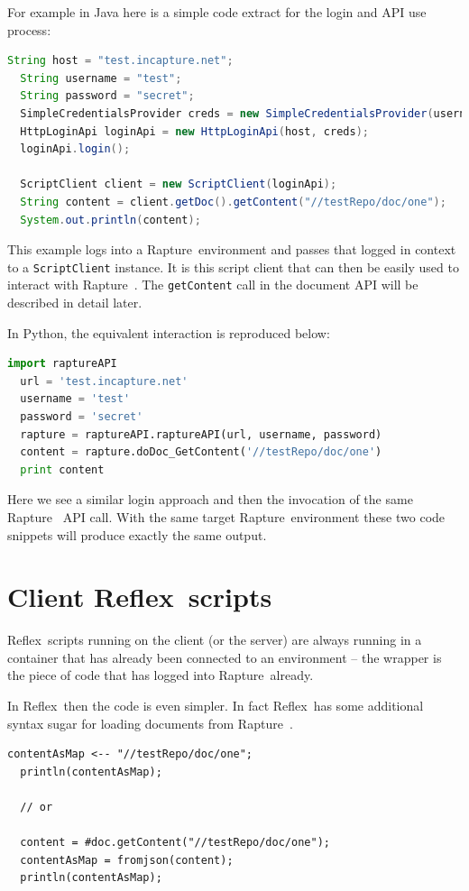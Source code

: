 \documentclass[12pt,twoside,a4paper]{book}
\newcommand{\Rapture}{Rapture~}
\newcommand{\Reflex}{Reflex~}
\begin{document}
For example in Java here is a simple code extract for the login and API use process:

\begin{lstlisting}[caption={Java simple example}, language=Java]
  String host = "test.incapture.net";
  String username = "test";
  String password = "secret";
  SimpleCredentialsProvider creds = new SimpleCredentialsProvider(username, password);
  HttpLoginApi loginApi = new HttpLoginApi(host, creds);
  loginApi.login();

  ScriptClient client = new ScriptClient(loginApi);
  String content = client.getDoc().getContent("//testRepo/doc/one");
  System.out.println(content);
\end{lstlisting}

This example logs into a \Rapture environment and passes that logged in context to a \verb+ScriptClient+
instance. It is this script client that can then be easily used to interact with \Rapture. The
\verb+getContent+ call in the document API will be described in detail later.

In Python, the equivalent interaction is reproduced below:

\begin{lstlisting}[caption={Python simple example}, language=Python]
  import raptureAPI
  url = 'test.incapture.net'
  username = 'test'
  password = 'secret'
  rapture = raptureAPI.raptureAPI(url, username, password)
  content = rapture.doDoc_GetContent('//testRepo/doc/one')
  print content
\end{lstlisting}

Here we see a similar login approach and then the invocation of the same \Rapture
API call. With the same target \Rapture environment these two code snippets will
produce exactly the same output.

\section{Client \Reflex scripts}

\Reflex scripts running on the client (or the server) are always running in a
container that has already been connected to an environment -- the wrapper is
the piece of code that has logged into \Rapture already.

In \Reflex then the code is even simpler. In fact \Reflex has some additional
syntax sugar for loading documents from \Rapture.

\begin{lstlisting}[caption={Reflex simple example}, language=reflex]
  contentAsMap <-- "//testRepo/doc/one";
  println(contentAsMap);

  // or

  content = #doc.getContent("//testRepo/doc/one");
  contentAsMap = fromjson(content);
  println(contentAsMap);
\end{lstlisting}
\end{document}
